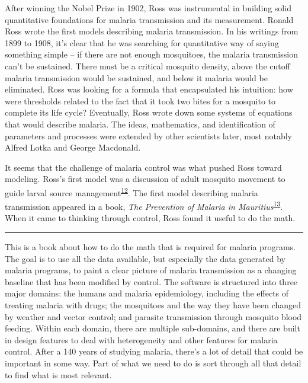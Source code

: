 \documentclass[
]{book}
\begin{document}
After winning the Nobel Prize in 1902, Ross was instrumental in building solid quantitative foundations for malaria transmission and its measurement. Ronald Ross wrote the first models describing malaria transmission. In his writings from 1899 to 1908, it's clear that he was searching for quantitative way of saying something simple -- if there are not enough mosquitoes, the malaria transmission can't be sustained. There must be a critical mosquito density, above the cutoff malaria transmission would be sustained, and below it malaria would be eliminated. Ross was looking for a formula that encapsulated his intuition: how were thresholds related to the fact that it took two bites for a mosquito to complete its life cycle? Eventually, Ross wrote down some systems of equations that would describe malaria. The ideas, mathematics, and identification of parameters and processes were extended by other scientists later, most notably Alfred Lotka and George Macdonald.

It seems that the challenge of malaria control was what pushed Ross toward modeling. Ross's first model was a discussion of adult mosquito movement to guide larval source management\textsuperscript{\protect\hyperlink{ref-RossR1905LogicalBasis}{12}}. The first model describing malaria transmission appeared in a book, \emph{The Prevention of Malaria in Mauritius}\textsuperscript{\protect\hyperlink{ref-RossR1908}{13}}. When it came to thinking through control, Ross found it useful to do the math.

\begin{center}\rule{0.5\linewidth}{0.5pt}\end{center}

This is a book about how to do the math that is required for malaria programs. The goal is to use all the data available, but especially the data generated by malaria programs, to paint a clear picture of malaria transmission as a changing baseline that has been modified by control. The software is structured into three major domains: the humans and malaria epidemiology, including the effects of treating malaria with drugs; the mosquitoes and the way they have been changed by weather and vector control; and parasite transmission through mosquito blood feeding. Within each domain, there are multiple sub-domains, and there are built in design features to deal with heterogeneity and other features for malaria control. After a 140 years of studying malaria, there's a lot of detail that could be important in some way. Part of what we need to do is sort through all that detail to find what is most relevant.
\end{document}
